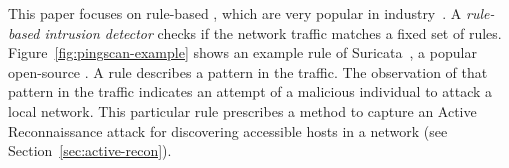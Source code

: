 \documentclass[conference]{IEEEtran}
\begin{document}

This paper focuses on rule-based \nids{}, which are very popular in
industry~\cite{proofpoint-etpro,snort-rule-subscriptions}. A
\emph{rule-based intrusion detector} checks if the network traffic matches a fixed
set of rules. Figure~\ref{fig:pingscan-example} shows an example rule
of Suricata~\cite{suricata}, a popular open-source \nids{}. A rule
describes a pattern in the traffic. The observation of that pattern in
the traffic indicates an attempt of a malicious individual
to attack a local network. This particular rule prescribes a method to
capture an Active Reconnaissance attack for discovering accessible
hosts in a network (see Section~\ref{sec:active-recon}).
\end{document}
